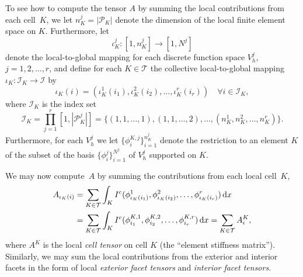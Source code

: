 To see how to compute the tensor $A$ by summing the local
contributions from each cell~$K$, we let $n^j_K = |\mathcal{P}_K|$
denote the dimension of the local finite
element space on $K$. Furthermore, let
\begin{equation}
  \iota_K^j : [1,n_K^j] \rightarrow [1,N^j] \label{eq:iota_K}
\end{equation}
denote the local-to-global mapping for each discrete
function space $V_h^j$, $j=1,2,\ldots,r$, and define for each $K \in
\mathcal{T}$ the collective local-to-global mapping $\iota_K :
\mathcal{I}_K \rightarrow \mathcal{I}$ by
\begin{equation}
  \iota_K(i) =
  (\iota_K^1(i_1),\iota_K^2(i_2),\ldots,\iota_K^r(i_r))
  \quad \forall i \in \mathcal{I}_K,
\end{equation}
where $\mathcal{I}_K$ is the index set
\begin{equation}
  \mathcal{I}_K = 
  \prod_{j=1}^r[1,|\mathcal{P}_K^j|] = \{(1,1,\ldots,1), (1,1,\ldots,2), \ldots,
  (n_K^1,n_K^2,\ldots,n_K^r)\}.
\end{equation}
Furthermore, for each $V_h^j$ we let $\{\phi^{K,j}_i\}_{i=1}^{n_K^j}$
denote the restriction to an element $K$ of the subset of the basis
$\{\phi_i^j\}_{i=1}^{N^j}$ of $V_h^j$ supported on $K$.

We may now compute~$A$ by summing the contributions from
each local cell~$K$,
\begin{equation}
  \begin{split}
  A_{\iota_K(i)}
  &=
  \sum_{K\in\mathcal{T}} \int_K
  I^c(\phi_{\iota_K(i_1)}^1, \phi_{\iota_K(i_2)}^2, \ldots, \phi_{\iota_K(i_r)}^r) \, \mathrm{d}x \\
  &=
  \sum_{K\in\mathcal{T}} \int_K
  I^c(\phi_{i_1}^{K,1},
      \phi_{i_2}^{K,2}, \ldots,
      \phi_{i_r}^{K,r}) \, \mathrm{d}x
  =
  \sum_{K\in\mathcal{T}}
  A^K_i,
  \end{split}
\end{equation}
where $A^K$ is the local \emph{cell tensor} on cell $K$ (the ``element
stiffness matrix''). Similarly, we may sum the local contributions
from the exterior and interior facets in the form of local
\emph{exterior facet tensors} and \emph{interior facet tensors}.

